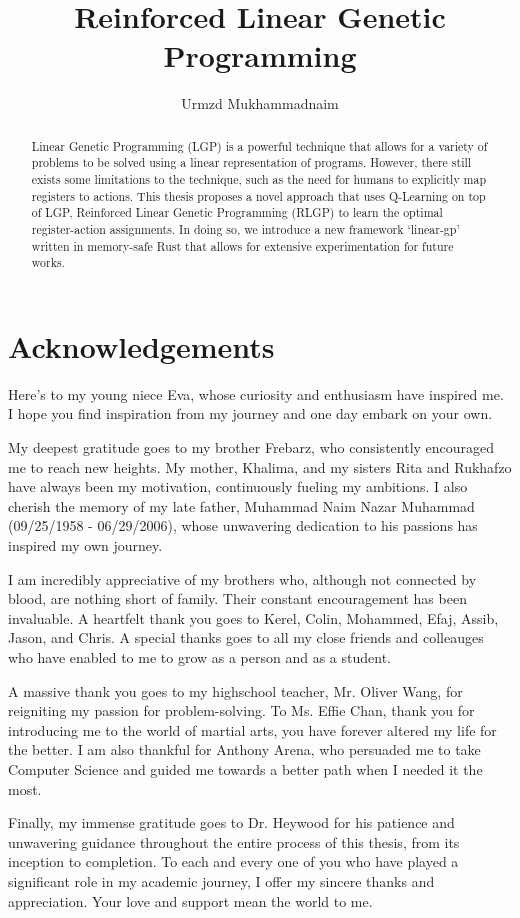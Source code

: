 \documentclass[12pt]{report}
\newcommand{\bcshon}{}
\newcommand{\defenceday}[1]{}
\newcommand{\defencemonth}[1]{}
\newcommand{\defenceyear}[1]{}
\newcommand{\convocation}[2]{}
\newcommand{\supervisor}[1]{}
\newcommand{\reader}[1]{}
\newcommand{\frontmatter}{}
\newenvironment{acknowledgements}{\chapter*{Acknowledgements}}{}
\begin{document}
\bcshon
\title{Reinforced Linear Genetic Programming}
\author{Urmzd Mukhammadnaim}
\defenceday{12}
\defencemonth{April}
\defenceyear{2023}
\convocation{May}{2023}

\supervisor{M. Heywood}
\reader{N. Zincir-Heywood}

\frontmatter
{}
\listofalgorithms
\lstlistoflistings

\begin{abstract}
	Linear Genetic Programming (LGP) is a powerful technique that allows for a variety of problems to be solved using a linear representation of programs. However, there still exists some limitations to the technique, such as the need for humans to explicitly map registers to actions. This thesis proposes a novel approach that uses Q-Learning on top of LGP, Reinforced Linear Genetic Programming (RLGP) to learn the optimal register-action assignments. In doing so, we introduce a new framework `linear-gp' written in memory-safe Rust that allows for extensive experimentation for future works.
\end{abstract}

\begin{acknowledgements}
Here's to my young niece Eva, whose curiosity and enthusiasm have inspired me. I hope you find inspiration from my journey and one day embark on your own.

My deepest gratitude goes to my brother Frebarz, who consistently encouraged me to reach new heights.
My mother, Khalima, and my sisters Rita and Rukhafzo have always been my motivation, continuously fueling my ambitions.
I also cherish the memory of my late father, Muhammad Naim Nazar Muhammad (09/25/1958 - 06/29/2006), whose unwavering dedication to his passions has inspired my own journey.

I am incredibly appreciative of my brothers who, although not connected by blood, are nothing short of family.
Their constant encouragement has been invaluable.
A heartfelt thank you goes to Kerel, Colin, Mohammed, Efaj, Assib, Jason, and Chris.
A special thanks goes to all my close friends and colleauges who have enabled to me to grow as a person and as a student.

A massive thank you goes to my highschool teacher, Mr. Oliver Wang, for reigniting my passion for problem-solving.
To Ms. Effie Chan, thank you for introducing me to the world of martial arts, you have forever altered my life for the better.
I am also thankful for Anthony Arena, who persuaded me to take Computer Science and guided me towards a better path when I needed it the most.

Finally, my immense gratitude goes to Dr. Heywood for his patience and unwavering guidance throughout the entire process of this thesis, from its inception to completion. To each and every one of you who have played a significant role in my academic journey, I offer my sincere thanks and appreciation. Your love and support mean the world to me.
\end{acknowledgements}
\end{document}
